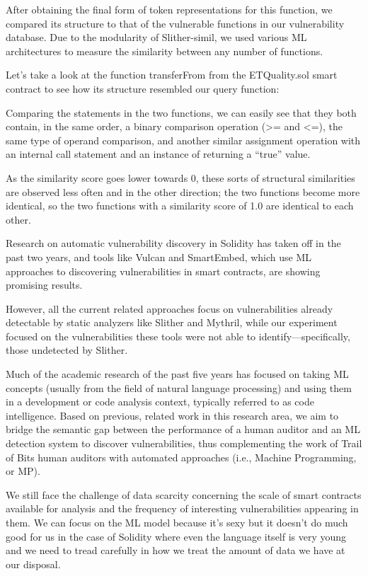 After obtaining the final form of token representations for this function, we compared its structure to that of the vulnerable functions in our vulnerability database.
Due to the modularity of Slither-simil, we used various ML architectures to measure the similarity between any number of functions.

Let's take a look at the function transferFrom from the ETQuality.sol smart contract to see how its structure resembled our query function:

Comparing the statements in the two functions, we can easily see that they both contain, in the same order, a binary comparison operation (>= and <=), the same type of operand comparison, and another similar assignment operation with an internal call statement and an instance of returning a “true” value.

As the similarity score goes lower towards 0, these sorts of structural similarities are observed less often and in the other direction; the two functions become more identical, so the two functions with a similarity score of 1.0 are identical to each other.

Research on automatic vulnerability discovery in Solidity has taken off in the past two years, and tools like Vulcan and SmartEmbed, which use ML approaches to discovering vulnerabilities in smart contracts, are showing promising results.

However, all the current related approaches focus on vulnerabilities already detectable by static analyzers like Slither and Mythril, while our experiment focused on the vulnerabilities these tools were not able to identify—specifically, those undetected by Slither.

Much of the academic research of the past five years has focused on taking ML concepts (usually from the field of natural language processing) and using them in a development or code analysis context, typically referred to as code intelligence.
Based on previous, related work in this research area, we aim to bridge the semantic gap between the performance of a human auditor and an ML detection system to discover vulnerabilities, thus complementing the work of Trail of Bits human auditors with automated approaches (i.e., Machine Programming, or MP).

We still face the challenge of data scarcity concerning the scale of smart contracts available for analysis and the frequency of interesting vulnerabilities appearing in them.
We can focus on the ML model because it's sexy but it doesn't do much good for us in the case of Solidity where even the language itself is very young and we need to tread carefully in how we treat the amount of data we have at our disposal.

